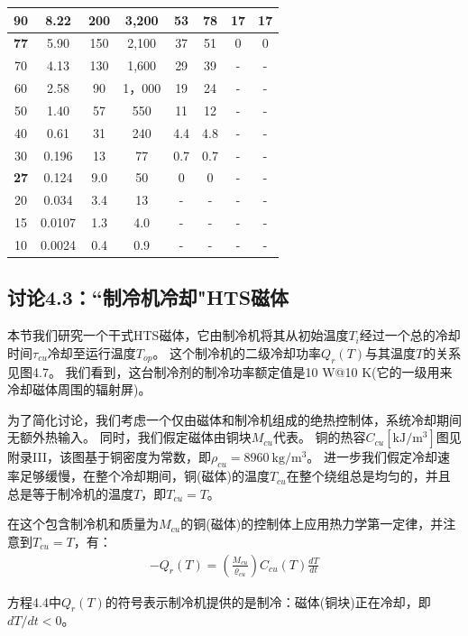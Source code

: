 \begin{table}[htbp]
\begin{tabular}{|c|c|c|c|c|c|c|c|}
90 & 8.22 & 200 & 3,200 & 53 & 78 & 17 & 17 \\ \hline
\textbf{77} & 5.90 & 150 & 2,100 & 37 & 51 & 0 & 0 \\ \hline
70 & 4.13 & 130 & 1,600 & 29 & 39 & - & - \\ \hline
60 & 2.58 & 90 & 1，000 & 19 & 24 & - & - \\ \hline
50 & 1.40 & 57 & 550 & 11 & 12 & - & - \\ \hline
40 & 0.61 & 31 & 240 & 4.4 & 4.8 & - & - \\ \hline
30 & 0.196 & 13 & 77 & 0.7 & 0.7 & - & - \\ \hline
\textbf{27} & 0.124 & 9.0 & 50 & 0 & 0 & - & - \\ \hline
20 & 0.034 & 3.4 & 13 & - & - & - & - \\ \hline
15 & 0.0107 & 1.3 & 4.0 & - & - & - & - \\ \hline
10 & 0.0024 & 0.4 & 0.9 & - & - & - & - \\ \hline
\end{tabular}
\end{table}

\subsection{讨论4.3：``制冷机冷却"HTS磁体}
本节我们研究一个干式HTS磁体，它由制冷机将其从初始温度$T_i$经过一个总的冷却时间$\tau_{cu}$冷却至运行温度$T_{op}$。
这个制冷机的二级冷却功率$Q_r(T)$与其温度$T$的关系见图4.7。
我们看到，这台制冷剂的制冷功率额定值是10 W@10 K(它的一级用来冷却磁体周围的辐射屏)。

为了简化讨论，我们考虑一个仅由磁体和制冷机组成的绝热控制体，系统冷却期间无额外热输入。
同时，我们假定磁体由铜块$M_{cu}$代表。
铜的热容$C_{cu}[\mathrm{kJ/m^3}]$图见附录III，该图基于铜密度为常数，即$\rho_{cu}=8960\ \mathrm{kg/m^3}$。
进一步我们假定冷却速率足够缓慢，在整个冷却期间，铜(磁体)的温度$T_{cu}$在整个绕组总是均匀的，并且总是等于制冷机的温度$T$，即$T_{cu}=T$。

在这个包含制冷机和质量为$M_{cu}$的铜(磁体)的控制体上应用热力学第一定律，并注意到$T_{cu}=T$，有：
\begin{align}%
-Q_r(T)=\left(\frac{M_{cu}}{\varrho_{cu}}\right)C_{cu}(T)\frac{dT}{dt}
\end{align}

方程4.4中$Q_r(T)$的符号表示制冷机提供的是制冷：磁体(铜块)正在冷却，即$dT/dt<0$。

